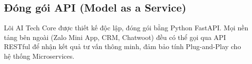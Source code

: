 \subsection{Đóng gói API (Model as a Service)}
Lõi AI Tech Core được thiết kế độc lập, đóng gói bằng Python FastAPI. Mọi nền tảng bên ngoài (Zalo Mini App, CRM, Chatwoot) đều có thể gọi qua API RESTful để nhận kết quả tư vấn thông minh, đảm bảo tính Plug-and-Play cho hệ thống Microservices.
